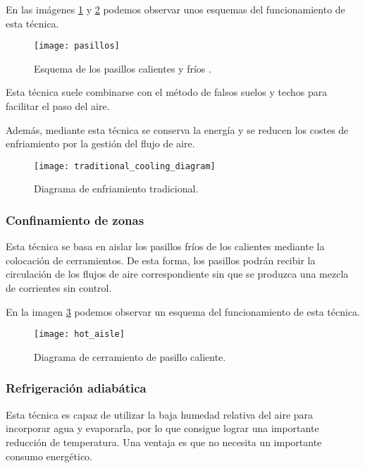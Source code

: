 En las imágenes \ref{pasillos} y \ref{traditional_cooling} podemos observar unos esquemas del funcionamiento de esta técnica.

\begin{figure}
    \begin{center}
    \caption{Esquema de los pasillos calientes y fríos \cite{Kelvion}.}
    \label{pasillos}
    \texttt{[image: pasillos]}
    \end{center}
\end{figure}

Esta técnica suele combinarse con el método de falsos suelos y techos para facilitar el paso del aire.

Además, mediante esta técnica se conserva la energía y se reducen los costes de enfriamiento por la gestión del flujo de aire.

\begin{figure}
    \begin{center}
    \caption{Diagrama de enfriamiento tradicional.}
    \label{traditional_cooling}
    \texttt{[image: traditional\_cooling\_diagram]}
    \end{center}
\end{figure}

\subsubsection{Confinamiento de zonas}

Esta técnica se basa en aislar los pasillos fríos de los calientes mediante la colocación de cerramientos. De esta forma, los pasillos podrán recibir la circulación de los flujos de aire correspondiente sin que se produzca una mezcla de corrientes sin control.

En la imagen \ref{hot_aisle} podemos observar un esquema del funcionamiento de esta técnica.

\begin{figure}
    \begin{center}
    \caption{Diagrama de cerramiento de pasillo caliente.}
    \label{hot_aisle}
    \texttt{[image: hot\_aisle]}
    \end{center}
\end{figure}

\subsubsection{Refrigeración adiabática}

Esta técnica es capaz de utilizar la baja humedad relativa del aire para incorporar agua y evaporarla, por lo que consigue lograr una importante reducción de temperatura. Una ventaja es que no necesita un importante consumo energético.

